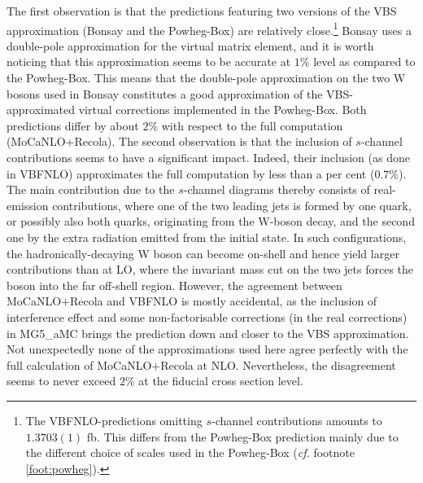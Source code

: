 The first observation is that the predictions featuring two versions
of the VBS approximation ({\sc Bonsay} and the {\sc Powheg-Box}) are
relatively close.\footnote{The {\sc VBFNLO}-predictions omitting
$s$-channel contributions amounts to $1.3703(1)$ fb. This differs from
the {\sc Powheg-Box} prediction mainly due to the different choice of
scales used in the {\sc Powheg-Box} (\emph{cf.}
footnote \ref{foot:powheg}).} {\sc Bonsay} uses a double-pole
approximation for the virtual matrix element, and it is worth noticing
that this approximation seems to be accurate at $1\%$ level as
compared to the {\sc Powheg-Box}. This means that the double-pole
approximation on the two W bosons used in {\sc Bonsay} constitutes a
good approximation of the VBS-approxi\-mated virtual corrections
implemented in the {\sc Powheg-Box}.  Both predictions differ by about
$2\%$ with respect to the full computation ({\sc MoCaNLO+Recola}).
The second observation is that the inclusion of $s$-channel
contributions seems to have a significant impact.  Indeed, their
inclusion (as done in {\sc VBFNLO}) approximates the full computation
by less than a per cent ($0.7\%$). The main contribution due to 
the $s$-channel diagrams thereby consists of real-emission
contributions, where one of the two leading jets is formed by one
quark, or possibly also both quarks, originating from the W-boson decay,
and the second one by the extra radiation emitted from the initial
state. In such configurations, the hadronically-decaying W boson can
become on-shell and hence yield larger contributions than at LO, where
the invariant mass cut on the two jets forces the boson into the far
off-shell region.
However, the agreement between {\sc MoCaNLO+Recola} and {\sc VBFNLO} is mostly accidental, as the inclusion of interference effect and some non-factorisable corrections (in the real corrections) in {\sc MG5\_aMC} brings the prediction down and closer to the VBS approximation.
Not unexpectedly none of the approximations used here agree perfectly with the full calculation of {\sc MoCaNLO\-+Recola} at NLO.
Nevertheless, the disagreement seems to never exceed $2\%$ at the fiducial cross section level.


